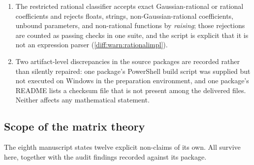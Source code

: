 \documentclass[11pt,letterpaper]{article}
\numberwithin{equation}{section}
\theoremstyle{definition}
\theoremstyle{remark}
\begin{document}
\begin{enumerate}[label=\textup{N\arabic*.},leftmargin=3.0em,itemsep=0.35em,start=48]
not a proof of Hahn summability.
\item The restricted rational classifier accepts exact Gaussian-rational or
rational coefficients and rejects floats, strings, non-Gaussian-rational
coefficients, unbound parameters, and non-rational functions by \emph{raising};
those rejections are counted as passing checks in one suite, and the script is
explicit that it is not an expression parser
(\cref{diff:warn:rationalimpl}).
\item Two artifact-level discrepancies in the source packages are recorded
rather than silently repaired: one package's PowerShell build script was
supplied but not executed on Windows in the preparation environment, and one
package's README lists a checksum file that is not present among the delivered
files. Neither affects any mathematical statement.
\end{enumerate}

\subsection{Scope of the matrix theory}
\label{diff:sub:nc:matrixscope}

The eighth manuscript states twelve explicit non-claims of its own. All survive
here, together with the audit findings recorded against its package.
\end{document}

